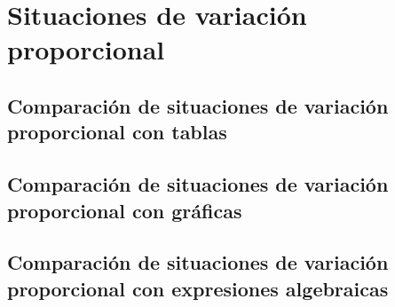 \thispagestyle{plain}
\section{Situaciones de variación proporcional}

\subsection{Comparación de situaciones de variación proporcional con tablas}

\subsection{Comparación de situaciones de variación proporcional con gráficas}

\subsection{Comparación de situaciones de variación proporcional con expresiones algebraicas}
\newpage